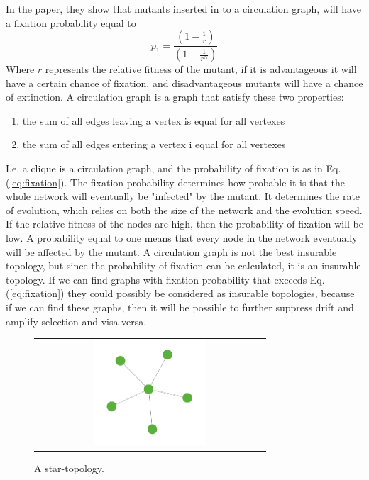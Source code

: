 In the \cite{lieberman2005evolutionary} paper, they show that mutants inserted in to a
 circulation graph, will have a fixation probability equal to
\begin{equation}  
p_{1}=\frac{(1-\frac{1}{r})}{(1-\frac{1}{r^{N}})}
 \label{eq:fixation} 
\end{equation}
Where $r$ represents the relative fitness of the mutant, if it is advantageous it will have a certain chance of fixation, and disadvantageous mutants will have a chance of extinction. 
A circulation graph is a graph that satisfy these two properties: 
\begin{enumerate}
\item the sum of all edges leaving a vertex is equal for all vertexes
\item the sum of all edges entering a vertex i equal for all vertexes
\end{enumerate}
I.e. a clique is a circulation graph, and the probability of fixation is as in Eq. (\ref{eq:fixation}).
The fixation probability determines how probable it is that the whole network will eventually be
"infected" by the mutant. It determines the rate of evolution, which relies on both the size of the
network and the evolution speed. 
If the relative fitness of the nodes are high, then the probability of fixation will be low.
A probability equal to one means that every node in the network eventually will be affected by the mutant.
A circulation graph is not the best insurable topology, but since the probability of fixation can be calculated, it is an insurable topology. If we can find graphs with  fixation probability that exceeds Eq.(\ref{eq:fixation}) they could possibly be considered as insurable topologies, because if we can find these graphs, then it will be possible to further suppress drift and amplify selection and visa versa. 
\begin{figure}[b]
\centering
\begin{tabular}{@{}c@{}}
\includegraphics[width=0.5\textwidth]{../Figures/aStar.png}
\end{tabular}
\caption{
\label{fig:star} A star-topology. 
}
\end{figure}
